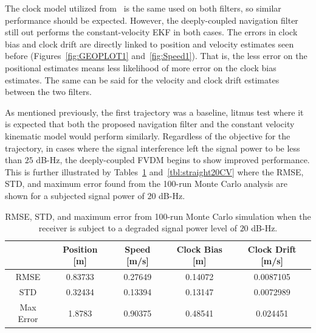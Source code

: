 The clock model utilized from~\cite{wangKalmanFilterBasedIntegrity} is the same used on both filters, so similar performance should be expected. However, the deeply-coupled navigation filter still out performs the constant-velocity EKF in both cases. The errors in clock bias and clock drift are directly linked to position and velocity estimates seen before (Figures~\ref{fig:GEOPLOT1} and~\ref{fig:Speed1}). That is, the less error on the positional estimates means less likelihood of more error on the clock bias estimates. The same can be said for the velocity and clock drift estimates between the two filters.

As mentioned previously, the first trajectory was a baseline, litmus test where it is expected that both the proposed navigation filter and the constant velocity kinematic model would perform similarly. Regardless of the objective for the trajectory, in cases where the signal interference left the signal power to be less than \(25\) dB-Hz, the deeply-coupled FVDM begins to show improved performance. This is further illustrated by Tables~\ref{tbl:straight20FVDM} and~\ref{tbl:straight20CV} where the RMSE, STD, and maximum error found from the 100-run Monte Carlo analysis are shown for a subjected signal power of \(20\) dB-Hz.

\begin{table}[!ht]
    \caption{RMSE, STD, and maximum error from 100-run Monte Carlo simulation when the receiver is subject to a degraded signal power level of \(20\) dB-Hz.}\label{tbl:straight20FVDM}
    \centering
    \begin{tabular}{ccccc}
        \toprule
                  & Position [m] & Speed [m/s] & Clock Bias [m] & Clock Drift [m/s] \\
        \midrule
        RMSE      & 0.83733      & 0.27649     & 0.14072        & 0.0087105         \\
        STD       & 0.32434      & 0.13394     & 0.13147        & 0.0072989         \\
        Max Error & 1.8783       & 0.90375     & 0.48541        & 0.024451          \\
        \bottomrule
    \end{tabular}
\end{table}

